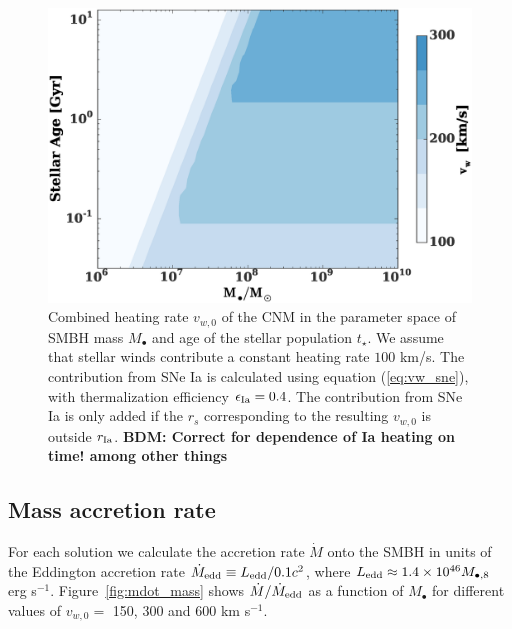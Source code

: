 \documentclass[usenatbib,fleqn]{mn2e}
\newcommand{\Mbh}[1][]{M_{\bullet#1}}
\newcommand{\rIa}{r_{\rm Ia}}
\newcommand{\vwO}{v_{w,0}}
\begin{document}
  \begin{figure}
    \includegraphics[width=\columnwidth]{vw-contour.eps}
    \caption{\label{fig:vweff} Combined heating rate $\vwO$ of the CNM
      in the parameter space of SMBH mass $\Mbh$ and age of the
      stellar population $t_{\star}$.  We assume that stellar winds
      contribute a constant heating rate $100$ km/s. The contribution
      from SNe Ia is calculated using equation (\ref{eq:vw_sne}), with
      thermalization efficiency $\epsilon_{\rm Ia}=0.4$. The
      contribution from SNe Ia is only added if the $r_s$
      corresponding to the resulting $\vwO$ is outside
      $\rIa$.  {\bf BDM: Correct for dependence of Ia heating on time! among other things}}%
  \end{figure}


\subsection{Mass accretion rate}

For each solution we calculate the accretion rate $\dot{M}$ onto the
SMBH in units of the Eddington accretion rate $\dot{M}_{\rm edd}
\equiv L_{\rm edd}/0.1 c^{2}$, where $L_{\rm edd} \approx 1.4\times
10^{46}M_{\bullet,8}$ erg s$^{-1}$.  Figure~\ref{fig:mdot_mass} shows
$\dot{M}/\dot{M}_{\rm edd}$ as a function of $\Mbh$ for different
values of $\vwO =$ 150, 300 and 600 km s$^{-1}$.
\end{document}
